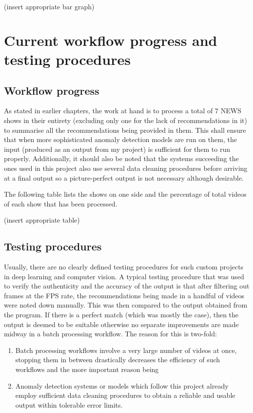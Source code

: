 (insert appropriate bar graph)

\section{Current workflow progress and testing procedures}

\subsection{Workflow progress}

As stated in earlier chapters, the work at hand is to process a total of $7$ NEWS shows in their entirety (excluding only one for the lack of recommendations in it) to summarise all the recommendations being provided in them. This shall ensure that when more sophisticated anomaly detection models are run on them, the input (produced as an output from my project) is sufficient for them to run properly. Additionally, it should also be noted that the systems succeeding the ones used in this project also use several data cleaning procedures before arriving at a final output so a picture-perfect output is not necessary although desirable. \par

The following table lists the shows on one side and the percentage of total videos of each show that has been processed.

(insert appropriate table)

\subsection{Testing procedures}

Usually, there are no clearly defined testing procedures for such custom projects in deep learning and computer vision. A typical testing procedure that was used to verify the authenticity and the accuracy of the output is that after filtering out frames at the FPS rate, the recommendations being made in a handful of videos were noted down manually. This was then compared to the output obtained from the program. If there is a perfect match (which was mostly the case), then the output is deemed to be suitable otherwise no separate improvements are made midway in a batch processing workflow. The reason for this is two-fold:

\begin{enumerate}

 \item Batch processing workflows involve a very large number of videos at once, stopping them in between drastically decreases the efficiency of such workflows and the more important reason being

 \item Anomaly detection systems or models which follow this project already employ sufficient data cleaning procedures to obtain a reliable and usable output within tolerable error limits.

\end{enumerate}

